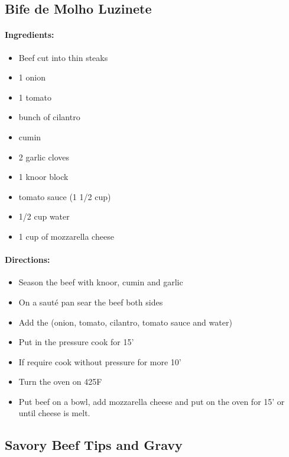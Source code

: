 \documentclass{article}
\begin{document}
\subsection{Bife de Molho Luzinete}

\paragraph{Ingredients:}
\begin{itemize}
    \item Beef cut into thin steaks
    \item 1 onion
    \item 1 tomato
    \item bunch of cilantro
    \item cumin
    \item 2 garlic cloves
    \item 1 knoor block
    \item tomato sauce (1 1/2 cup)
    \item 1/2 cup water
    \item 1 cup of mozzarella cheese
\end{itemize}

\paragraph{Directions:}
\begin{itemize}
    \item Season the beef with knoor, cumin and garlic
    \item On a sauté pan sear the beef both sides
    \item Add the (onion, tomato, cilantro, tomato sauce and water)
    \item Put in the pressure cook for 15'
    \item If require cook without pressure for more 10'
    \item Turn the oven on 425F
    \item Put beef on a bowl, add mozzarella cheese and put on the oven for 15' or until cheese is melt.
\end{itemize}

\subsection{Savory Beef Tips and Gravy}
\end{document}
